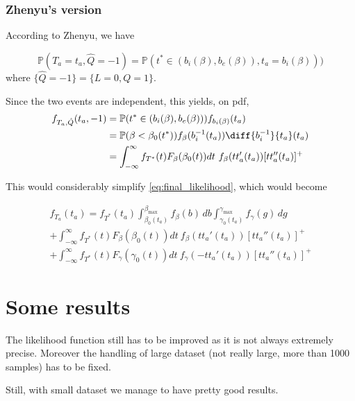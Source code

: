 \documentclass{article}
\begin{document}
\subsubsection{Zhenyu's version}

According to Zhenyu, we have

\begin{equation*}
  \mathbb{P}(T_a = t_a, \hat{Q} = -1) = \mathbb{P}(t^* \in (b_i(\beta), b_e(\beta)), t_a = b_i(\beta)))
\end{equation*}
where \(\{\hat{Q} = -1\} = \{L = 0, Q = 1\}\).

Since the two events are independent, this yields, on pdf,
\begin{align*}
  f_{T_a, \hat{Q}}(t_a, -1) & = \mathbb{P}(t^* \in (b_i(\beta), b_e(\beta)))f_{b_i(\beta)}(t_a) \\
  & = \mathbb{P}(\beta < \beta_0(t^*)) f_\beta(b_i^{-1}(t_a)) \diff{b_i^{-1}}{t_a}(t_a) \\
  & = \int_{-\infty}^\infty f_{T^*}(t) F_\beta(\beta_0(t)) dt\ f_\beta(tt_a'(t_a))[tt_a''(t_a)]^+
\end{align*}

This would considerably simplify \eqref{eq:final_likelihood}, which would become

\begin{multline}
  \label{eq:final_zhenyu}
  f_{T_a}(t_a) = f_{T^*}(t_a)\int_{\beta_0(t_a)}^{\beta_\text{max}}f_\beta(b)\, db\int_{\gamma_0(t_a)}^{\gamma_\text{max}}f_\gamma(g)\, dg \\
  + \int_{-\infty}^\infty f_{T^*}(t) F_\beta(\beta_0(t)) dt\ f_\beta(tt_a'(t_a))[tt_a''(t_a)]^+\\
  + \int_{-\infty}^\infty f_{T^*}(t) F_\gamma(\gamma_0(t)) dt\ f_\gamma(-tt_a'(t_a))[tt_a''(t_a)]^+
\end{multline}
\section{Some results}

The likelihood function still has to be improved as it is not always extremely precise. Moreover the handling of large dataset (not really large, more than 1000 samples) has to be fixed.

Still, with small dataset we manage to have pretty good results.
\end{document}
